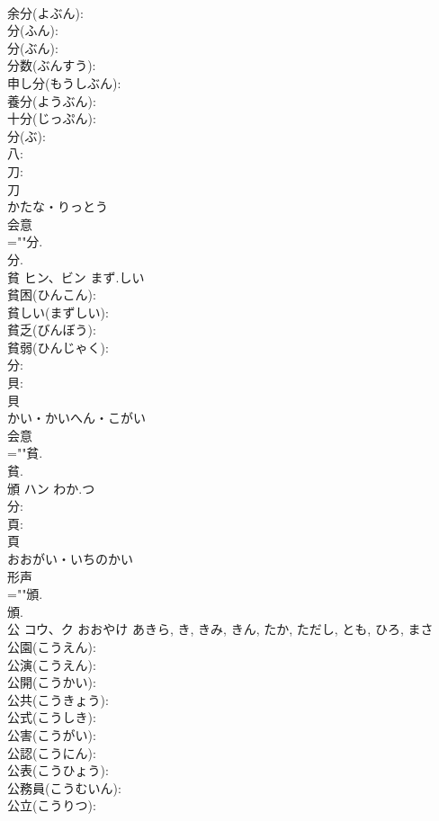 \documentclass[8pt]{extreport}
\begin{document}
\begin{CJK}{UTF8}{min}
\\	余分(よぶん): 
\\	分(ふん): 
\\	分(ぶん): 
\\	分数(ぶんすう): 
\\	申し分(もうしぶん): 
\\	養分(ようぶん): 
\\	十分(じっぷん): 
\\	分(ぶ): 
\\	八: 
\\	刀: 
\\	刀	
\\	かたな・りっとう	
\\	会意 
\\	=""分.
\\	分.
\\	貧	ヒン、ビン	まず.しい		
\\	貧困(ひんこん): 
\\	貧しい(まずしい): 
\\	貧乏(びんぼう): 
\\	貧弱(ひんじゃく): 
\\	分: 
\\	貝: 
\\	貝	
\\	かい・かいへん・こがい	
\\	会意 
\\	=""貧.
\\	貧.
\\	頒	ハン	わか.つ		
\\	分: 
\\	頁: 
\\	頁	
\\	おおがい・いちのかい	
\\	形声 
\\	=""頒.
\\	頒.
\\	公	コウ、ク	おおやけ	あきら, き, きみ, きん, たか, ただし, とも, ひろ, まさ	
\\	公園(こうえん): 
\\	公演(こうえん): 
\\	公開(こうかい): 
\\	公共(こうきょう): 
\\	公式(こうしき): 
\\	公害(こうがい): 
\\	公認(こうにん): 
\\	公表(こうひょう): 
\\	公務員(こうむいん): 
\\	公立(こうりつ): 

\end{CJK}
\end{document}
